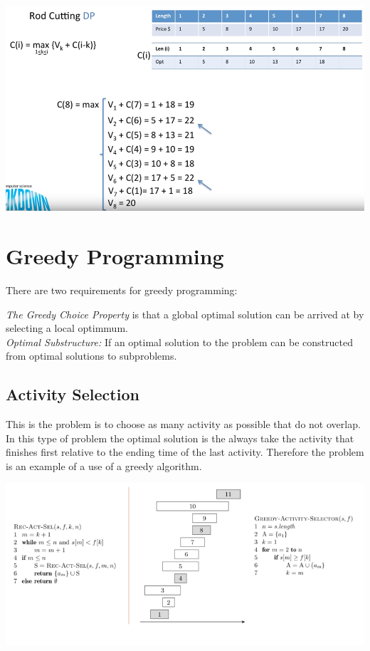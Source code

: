 \includegraphics[width=\textwidth]{images/RodCutting.png}

\section{Greedy Programming}

There are two requirements for greedy programming:

\emph{The Greedy Choice Property} is that a global optimal solution can be arrived at by selecting a local optimmum.\\

\emph{Optimal Substructure:} If an optimal solution to the problem can be constructed from optimal solutions to subproblems.\\

\subsection{Activity Selection}

This is the problem is to choose as many activity as possible that do not overlap. In this type of problem the optimal solution is the always take the activity that finishes first relative to the ending time of the last activity. Therefore the problem is an example of a use of a greedy algorithm. 

\includegraphics[width=\textwidth]{images/ActivitySelection.png}

